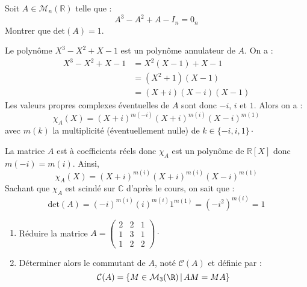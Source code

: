 \documentclass[a4paper,10pt]{report}
\begin{document}
\begin{Exa} Soit $A \in \mathcal{M}_{n}(\mathbb{R})$ telle que :
  \[
  A^{3} - A^{2} + A - I_n = 0_n
  \]
Montrer que $\textrm{det}(A) = 1$.
\end{Exa}

\corr Le polynôme $X^3-X^2+X-1$ est un polynôme annulateur de $A$. On a :
\begin{align*}
X^3-X^2+X-1 & = X^2(X-1)+X-1 \\
& = (X^2+1)(X-1) \\
& = (X+i)(X-i)(X-1)
\end{align*}
Les valeurs propres complexes éventuelles de $A$ sont donc $-i$, $i$ et $1$. Alors on a :
$$ \chi_A(X)= (X+i)^{m(-i)} (X+i)^{m(i)} (X-i)^{m(1)}$$
avec $m(k)$ la multiplicité (éventuellement nulle) de $k \in \lbrace -i, i ,1 \rbrace \cdot$

\medskip

\noindent La matrice $A$ est à coefficients réels donc $\chi_A$ est un polynôme de $\mathbb{R}[X]$ donc $m(-i)=m(i)$. Ainsi,
$$ \chi_A(X) = (X+i)^{m(i)} (X+i)^{m(i)} (X-i)^{m(1)}$$
Sachant que $\chi_A$ est scindé sur $\mathbb{C}$ d'après le cours, on sait que :
$$ \textrm{det}(A) = (-i)^{m(i)} (i)^{m(i)} 1^{m(1)} = (-i^2)^{m(i)} = 1$$

\begin{Exa}
\begin{enumerate}
\item R\'eduire la matrice $A= \left(\begin{array}{rrr}  2 & 2 & 1\\
1 & 3 & 1\\
1 & 2 & 2 \end{array}\right) \cdot $\\
\item Déterminer alors le commutant de $A$, noté $\mathcal{C}(A)$ et définie par : 
$${\cal C}(A)=\{M\in{\cal M}_3(\R) \, \vert \, AM=MA\}$$
\end{enumerate}
\end{Exa} 

\corr 
\end{document}
